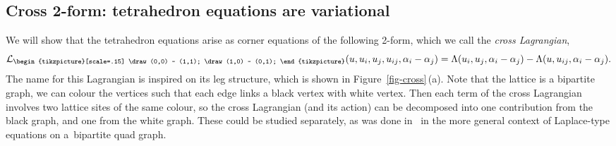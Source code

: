\documentclass[pdftex]{sigma}
\newcommand{\cross}{{\begin{tikzpicture}[scale=.15]
			\draw (0,0) -- (1,1);
			\draw (1,0) -- (0,1);
\end{tikzpicture}}}
\newcommand{\cL}{\mathcal{L}}
\numberwithin{equation}{section}
\begin{document}
\subsection{Cross 2-form: tetrahedron equations are variational}
\label{sec-cross}

We will show that the tetrahedron equations arise as corner equations of the following 2-form, which we call the \emph{cross Lagrangian},
\[
 \cL_\cross(u,u_i,u_j,u_{ij},\alpha_i-\alpha_j) = \Lambda(u_i, u_j,\alpha_i-\alpha_j) - \Lambda(u, u_{ij},\alpha_i-\alpha_j) .
\]
The name for this Lagrangian is inspired on its leg structure, which is shown in Figure~\ref{fig-cross}\,(a). Note that the lattice is a bipartite graph, we can colour the vertices such that each edge links a black vertex with white vertex. Then each term of the cross Lagrangian involves two lattice sites of the same colour, so the cross Lagrangian (and its action) can be decomposed into one contribution from the black graph, and one from the white graph. These could be studied separately, as was done in~\cite{bobenko2012discrete, bobenko2010lagrangian} in the more general context of Laplace-type equations on a~bipartite quad graph.
\end{document}
